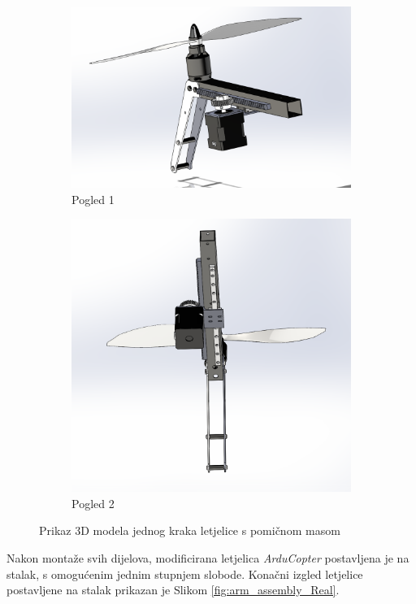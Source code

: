 \documentclass[11pt,a4paper]{article}
\begin{document}
\begin{figure}[H]
\centering
\begin{subfigure}{.5\textwidth}
  \centering
  \includegraphics[width=.9\linewidth]{figures/arm_assembly1.png}
  \caption{Pogled 1}
  \label{fig:sub1}
\end{subfigure}%
\begin{subfigure}{.5\textwidth}
  \centering
  \includegraphics[width=.9\linewidth]{figures/arm_assembly2.png}
  \caption{Pogled 2}
  \label{fig:sub2}
\end{subfigure}
\caption{Prikaz 3D modela jednog kraka letjelice s pomičnom masom}
\label{fig:arm_assembly}
\end{figure}


Nakon montaže svih dijelova, modificirana letjelica \textit{ArduCopter} postavljena je na stalak, s omogućenim jednim stupnjem slobode. Konačni izgled letjelice postavljene na stalak prikazan je Slikom \ref{fig:arm_assembly_Real}.
\end{document}
